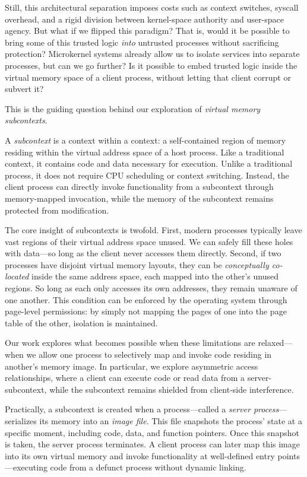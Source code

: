 Still, this architectural separation imposes costs such as context switches, syscall overhead, and a rigid division between kernel-space authority and user-space agency. But what if we flipped this paradigm? That is, would it be possible to bring some of this trusted logic \textit{into} untrusted processes without sacrificing protection? Microkernel systems already allow us to isolate services into separate processes, but can we go further? Is it possible to embed trusted logic inside the virtual memory space of a client process, without letting that client corrupt or subvert it?

This is the guiding question behind our exploration of \textit{virtual memory subcontexts}.

A \textit{subcontext} is a context within a context: a self-contained region of memory residing within the virtual address space of a host process. Like a traditional context, it contains code and data necessary for execution. Unlike a traditional process, it does not require CPU scheduling or context switching. Instead, the client process can directly invoke functionality from a subcontext through memory-mapped invocation, while the memory of the subcontext remains protected from modification.

The core insight of subcontexts is twofold. First, modern processes typically leave vast regions of their virtual address space unused. We can safely fill these holes with data—so long as the client never accesses them directly. Second, if two processes have disjoint virtual memory layouts, they can be \textit{conceptually co-located} inside the same address space, each mapped into the other’s unused regions. So long as each only accesses its own addresses, they remain unaware of one another. This condition can be enforced by the operating system through page-level permissions: by simply not mapping the pages of one into the page table of the other, isolation is maintained.

Our work explores what becomes possible when these limitations are relaxed—when we allow one process to selectively map and invoke code residing in another’s memory image. In particular, we explore asymmetric access relationships, where a client can execute code or read data from a server-subcontext, while the subcontext remains shielded from client-side interference.

Practically, a subcontext is created when a process—called a \textit{server process}—serializes its memory into an \textit{image file}. This file snapshots the process' state at a specific moment, including code, data, and function pointers. Once this snapshot is taken, the server process terminates. A client process can later map this image into its own virtual memory and invoke functionality at well-defined entry points—executing code from a defunct process without dynamic linking.

